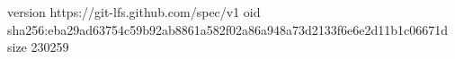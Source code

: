 version https://git-lfs.github.com/spec/v1
oid sha256:eba29ad63754c59b92ab8861a582f02a86a948a73d2133f6e6e2d11b1c06671d
size 230259
